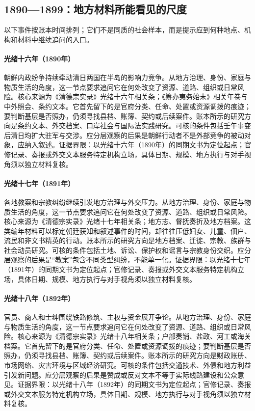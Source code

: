 \subsection{1890—1899：地方材料所能看见的尺度}
以下事件按账本时间排列；它们不是同质的社会样本，而是提示应到何种地点、机构和材料中继续追问的入口。
\hypertarget{social:EQ-1890-KOREAN-POLITICAL-CONFLICT}{}\paragraph{光绪十六年（1890年）}朝鲜内政纷争持续牵动清日两国在半岛的影响力竞争。从地方治理、身份、家庭与物质生活的角度，这一节点要求追问它在何处改变了资源、道路、组织或日常风险。核心来源为《清德宗实录》光绪十六年相关条；《筹办夷务始末》相关年卷与中外照会、条约文本。它首先留下的是官府分类、任命、处置或资源调拨的痕迹；要判断基层是否照办，仍须寻找县档、账簿、契约或后续案件。账本所示的研究方向是条约文本、外交档案、口岸社会与国际法实践研究。可核的条件包括壬午事变后清日均扩大驻军与交涉。应分层观察的后果是朝鲜行动者不是外部竞争的被动对象，应纳入叙述。证据界限：以光绪十六年（1890年）的同期文书为定位起点；官修记录、奏报或外交文本服务特定机构立场，具体日期、规模、地方执行与对手视角须以独立材料复核。
\hypertarget{social:EQ-1891-MISSIONARY-CONFLICTS}{}\paragraph{光绪十七年（1891年）}各地教案和宗教纠纷继续引发地方治理与外交压力。从地方治理、身份、家庭与物质生活的角度，这一节点要求追问它在何处改变了资源、道路、组织或日常风险。核心来源为《清德宗实录》光绪十七年相关条；地方志、督抚奏折及地方档案。这类编年材料可以标定朝廷获知和叙述事件的时间，却往往压低妇女、儿童、佃户、流民和非文书精英的行动。账本所示的研究方向是地方档案、迁徙、宗教、族群与社会动员研究。可核的条件包括土地、诉讼、保护权和谣言与宗教身份交织。应分层观察的后果是“教案”包含不同类型纠纷，不能单一化。证据界限：以光绪十七年（1891年）的同期文书为定位起点；官修记录、奏报或外交文本服务特定机构立场，具体日期、规模、地方执行与对手视角须以独立材料复核。
\hypertarget{social:EQ-1892-RAILWAY-DEBATE}{}\paragraph{光绪十八年（1892年）}官员、商人和士绅围绕铁路修筑、主权与资金展开争论。从地方治理、身份、家庭与物质生活的角度，这一节点要求追问它在何处改变了资源、道路、组织或日常风险。核心来源为《清德宗实录》光绪十八年相关条；户部奏销、盐政、河工或海关档案。它首先留下的是官府分类、任命、处置或资源调拨的痕迹；要判断基层是否照办，仍须寻找县档、账簿、契约或后续案件。账本所示的研究方向是财政账册、市场网络、灾害环境与区域经济研究。可核的条件包括交通技术、外债和地方利益引发新问题。应分层观察的后果是赞成或反对文本不等于实际线路建设和公众意见。证据界限：以光绪十八年（1892年）的同期文书为定位起点；官修记录、奏报或外交文本服务特定机构立场，具体日期、规模、地方执行与对手视角须以独立材料复核。
